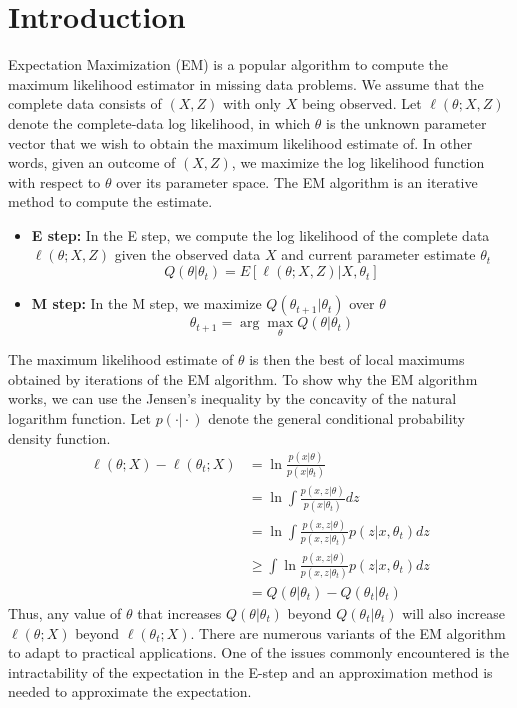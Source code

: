 \documentclass[11pt]{article}
\begin{document}
	\section{Introduction}
	Expectation Maximization (EM) is a popular algorithm to compute the maximum likelihood estimator in missing data problems. We assume that the complete data consists of $(X, Z)$ with only $X$ being observed. Let $\ell(\theta; X, Z)$ denote the complete-data log likelihood, in which $\theta$ is the unknown parameter vector that we wish to obtain the maximum likelihood estimate of. In other words, given an outcome of $(X, Z)$, we maximize the log likelihood function with respect to $\theta$ over its parameter space. The EM algorithm is an iterative method to compute the estimate.
	\begin{itemize}
		\item \textbf{E step:} In the E step, we compute the log likelihood of the complete data $\ell(\theta; X, Z)$ given the observed data $X$ and current parameter estimate $\theta_t$
		\begin{equation}
			Q(\theta \vert \theta_t) = E [\ell(\theta; X, Z) \vert X, \theta_t]
		\end{equation}
		\item \textbf{M step:} In the M step, we maximize $Q(\theta_{t+1} \vert \theta_t)$ over $\theta$ 
		\begin{equation}
			\theta_{t+1} = \arg \max_\theta Q(\theta \vert \theta_t)
		\end{equation}
	\end{itemize}
	The maximum likelihood estimate of $\theta$ is then the best of local maximums obtained by iterations of the EM algorithm. To show why the EM algorithm works, we can use the Jensen's inequality by the concavity of the natural logarithm function. Let $p(\cdot \vert \cdot)$ denote the general conditional probability density function.
	\begin{equation}
		\begin{split}
			\ell(\theta; X) - \ell (\theta_t; X)
			& = \ln \frac{p(x\vert \theta)}{p( x \vert \theta_t) } \\
			& = \ln \int \frac{p(x, z\vert \theta)}{p( x \vert \theta_t)} dz\\
			& = \ln \int \frac{p(x, z\vert \theta)}{p( x,z \vert \theta_t)} p(z \vert x, \theta_t) dz \\
			& \geq \int \ln \frac{p(x, z\vert \theta)}{p( x,z \vert \theta_t)} p(z \vert x, \theta_t) dz \\
			& = Q(\theta \vert \theta_t) - Q(\theta_t \vert \theta_t)
		\end{split}
	\end{equation}
	Thus, any value of $\theta$ that increases $Q(\theta \vert \theta_t)$ beyond $Q(\theta_t \vert \theta_t)$ will also increase $\ell(\theta; X)$ beyond $\ell(\theta_t; X)$. There are numerous variants of the EM algorithm to adapt to practical applications. One of the issues commonly encountered is the intractability of the expectation in the E-step and an approximation method is needed to approximate the expectation. 
	
\end{document}
